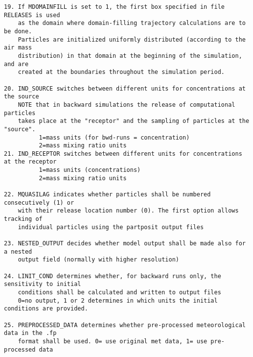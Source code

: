\documentclass{egu}                  %
\begin{document}
\begin{scriptsize}
\begin{verbatim}
19. If MDOMAINFILL is set to 1, the first box specified in file RELEASES is used
    as the domain where domain-filling trajectory calculations are to be done.
    Particles are initialized uniformly distributed (according to the air mass
    distribution) in that domain at the beginning of the simulation, and are
    created at the boundaries throughout the simulation period.

20. IND_SOURCE switches between different units for concentrations at the source
    NOTE that in backward simulations the release of computational particles
    takes place at the "receptor" and the sampling of particles at the "source".
          1=mass units (for bwd-runs = concentration)
          2=mass mixing ratio units
21. IND_RECEPTOR switches between different units for concentrations at the receptor
          1=mass units (concentrations)
          2=mass mixing ratio units

22. MQUASILAG indicates whether particles shall be numbered consecutively (1) or
    with their release location number (0). The first option allows tracking of
    individual particles using the partposit output files

23. NESTED_OUTPUT decides whether model output shall be made also for a nested
    output field (normally with higher resolution)

24. LINIT_COND determines whether, for backward runs only, the sensitivity to initial
    conditions shall be calculated and written to output files
    0=no output, 1 or 2 determines in which units the initial conditions are provided.

25. PREPROCESSED_DATA determines whether pre-processed meteorological data in the .fp
    format shall be used. 0= use original met data, 1= use pre-processed data
\end{verbatim}\end{scriptsize}

\newpage
\end{document}
